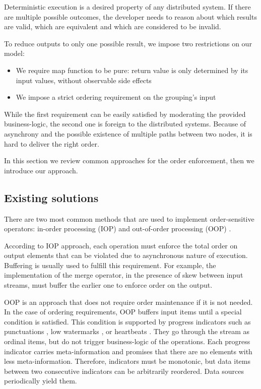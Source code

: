 \label {fs-collision}

Deterministic execution is a desired property of any distributed system. If there are multiple possible outcomes, the developer needs to reason about which results are valid, which are equivalent and which are considered to be invalid.

To reduce outputs to only one possible result, we impose two restrictions on our model: 

\begin{itemize}
  \item We require map function to be pure: return value is only determined by its input values, without observable side effects
  \item We impose a strict ordering requirement on the grouping's input
\end{itemize}

While the first requirement can be easily satisfied by moderating the provided business-logic, the second one is foreign to the distributed systems. Because of asynchrony and the possible existence of multiple paths between two nodes, it is hard to deliver the right order. 

In this section we review common approaches for the order enforcement, then we introduce our approach.

\subsection{Existing solutions}

There are two most common methods that are used to implement order-sensitive operators: in-order processing (IOP) \cite{Arasu:2006:CCQ:1146461.1146463, Cranor:2003:GSD:872757.872838} and out-of-order processing (OOP) \cite{Li:2008:OPN:1453856.1453890}.

According to IOP approach, each operation must enforce the total order on output elements that can be violated due to asynchronous nature of execution. Buffering is usually used to fulfill this requirement. For example, the implementation of the merge operator, in the presence of skew between input streams, must buffer the earlier one to enforce order on the output.

OOP is an approach that does not require order maintenance if it is not needed. In the case of ordering requirements, OOP buffers input items until a special condition is satisfied. This condition is supported by progress indicators such as punctuations \cite{Tucker:2003:EPS:776752.776780}, low watermarks \cite{Akidau:2013:MFS:2536222.2536229}, or heartbeats \cite{Srivastava:2004:FTM:1055558.1055596}. They go through the stream as ordinal items, but do not trigger business-logic of the operations. Each progress indicator carries meta-information and promises that there are no elements with less meta-information. Therefore, indicators must be monotonic, but data items between two consecutive indicators can be arbitrarily reordered. Data sources periodically yield them.

